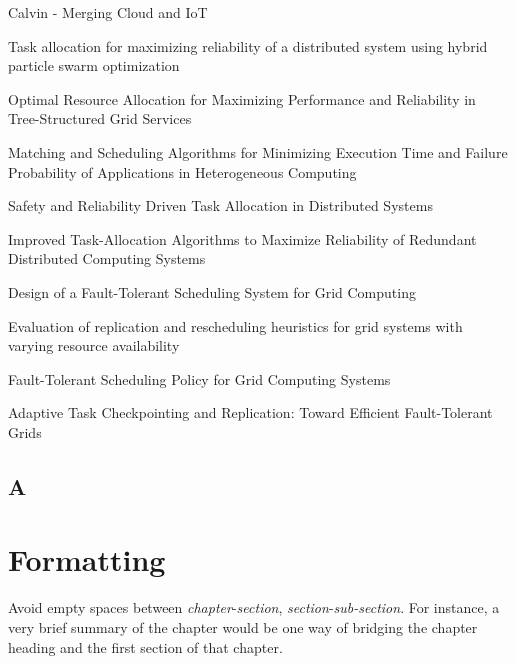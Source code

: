 \documentclass{cslthse-msc}
\begin{document}
\begin{thebibliography}{50}
Calvin - Merging Cloud and IoT

Task allocation for maximizing reliability of a distributed system using hybrid particle swarm optimization

Optimal Resource Allocation for Maximizing Performance and Reliability in Tree-Structured Grid Services 

Matching and Scheduling Algorithms for Minimizing Execution Time and Failure Probability of Applications in Heterogeneous Computing

Safety and Reliability Driven Task Allocation in Distributed Systems

Improved Task-Allocation Algorithms to Maximize Reliability of Redundant Distributed Computing Systems 

Design of a Fault-Tolerant Scheduling System for Grid Computing

Evaluation of replication and rescheduling heuristics for grid systems with varying resource availability

Fault-Tolerant Scheduling Policy for Grid Computing Systems

Adaptive Task Checkpointing and Replication: Toward Efficient Fault-Tolerant Grids

\end{thebibliography}

\begin{appendices}
\chapter{A}

\end{appendices}












\chapter[Short on Formatting]{Formatting}
Avoid empty spaces between \textit{chapter}-\textit{section}, \textit{section}-\textit{sub-section}. For instance, a very brief summary of the chapter would be one way of bridging the chapter heading and the first section of that chapter.
\end{document}
